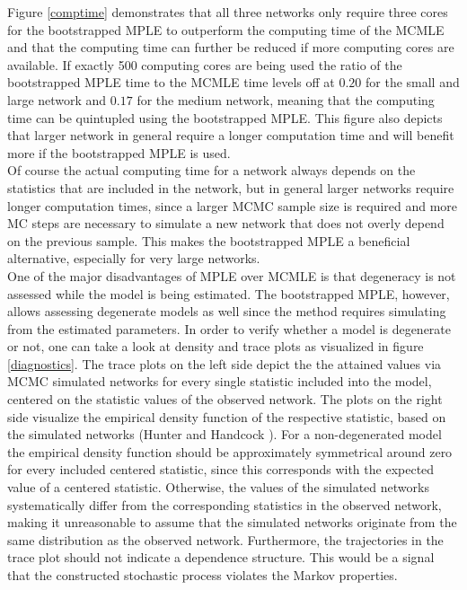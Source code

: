 \documentclass{llncs}
\begin{document}
Figure \ref{comptime} demonstrates that all three networks only require three cores for the bootstrapped MPLE to outperform the computing time of the MCMLE and that the computing time can further be reduced if more computing cores are available. If exactly 500 computing cores are being used the ratio of the bootstrapped MPLE time to the MCMLE time levels off at $0.20$ for the small and large network and $0.17$ for the medium network, meaning that the computing time can be quintupled using the bootstrapped MPLE. This figure also depicts that larger network in general require a longer computation time and will benefit more if the bootstrapped MPLE is used.\\ 
Of course the actual computing time for a network always depends on the statistics that are included in the network, but in general larger networks require longer computation times, since a larger MCMC sample size is required and more MC steps are necessary to simulate a new network that does not overly depend on the previous sample. This makes the bootstrapped MPLE a beneficial alternative, especially for very large networks. \\
\indent One of the major disadvantages of MPLE over MCMLE is that degeneracy is not assessed while the model is being estimated.  The bootstrapped MPLE, however, allows assessing degenerate models as well since the method requires simulating from the estimated parameters. In order to verify whether a model is degenerate or not, one can take a look at density and trace plots as visualized in figure \ref{diagnostics}. The trace plots on the left side depict the the attained values via MCMC simulated networks for every single statistic included into the model, centered on the statistic values of the observed network. The plots on the right side visualize the empirical density function of the respective statistic, based on the simulated networks (Hunter and Handcock \cite{Hunter.2006}). For a non-degenerated model the empirical density function should be approximately symmetrical around zero for every included centered statistic, since this corresponds with the expected value of a centered statistic. 
Otherwise, the values of the simulated networks systematically differ from the corresponding statistics in the observed network, making it unreasonable to assume that the simulated networks originate from the same distribution as the observed network. Furthermore, the trajectories in the trace plot should not indicate a dependence structure. This would be a signal that the constructed stochastic process violates the Markov properties.
\end{document}
